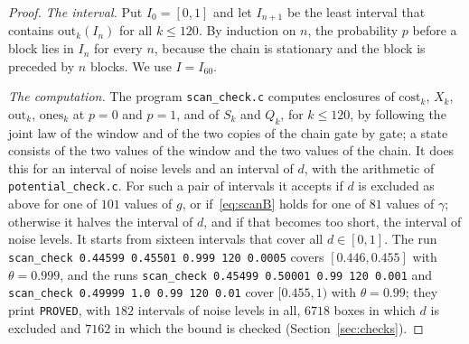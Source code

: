\documentclass[11pt]{amsart}
\theoremstyle{definition}
\theoremstyle{remark}
\begin{document}
\begin{proof}
\emph{The interval.} Put $I_0=[0,1]$ and let $I_{n+1}$ be the least interval that contains
$\mathrm{out}_k(I_n)$ for all $k\le120$. By induction on $n$, the probability $p$ before a
block lies in $I_n$ for every $n$, because the chain is stationary and the block is preceded by
$n$ blocks. We use $I=I_{60}$.

\emph{The computation.} The program \texttt{scan\_check.c} computes enclosures of
$\mathrm{cost}_k$, $X_k$, $\mathrm{out}_k$, $\mathrm{ones}_k$ at $p=0$ and $p=1$, and of $S_k$
and $Q_k$, for $k\le120$, by following the joint law of the window and of the two copies of the
chain gate by gate; a state consists of the two values of the window and the two values of the
chain. It does this for an interval of noise levels and an interval of $d$, with the arithmetic
of \texttt{potential\_check.c}. For such a pair of intervals it accepts if $d$ is excluded as
above for one of $101$ values of $g$, or if~\eqref{eq:scanB} holds for one of $81$ values of
$\gamma$; otherwise it halves the interval of $d$, and if that becomes too short, the interval
of noise levels. It starts from sixteen intervals that cover all $d\in[0,1]$. The run
\texttt{scan\_check 0.44599 0.45501 0.999 120 0.0005} covers $[0.446,0.455]$ with
$\theta=0.999$, and the runs \texttt{scan\_check 0.45499 0.50001 0.99 120 0.001} and
\texttt{scan\_check 0.49999 1.0 0.99 120 0.01} cover $[0.455,1)$ with $\theta=0.99$; they print
\texttt{PROVED}, with $182$ intervals of noise levels in all, $6718$ boxes in which $d$ is excluded and $7162$ in which the bound is checked (Section~\ref{sec:checks}).
\end{proof}
\end{document}

